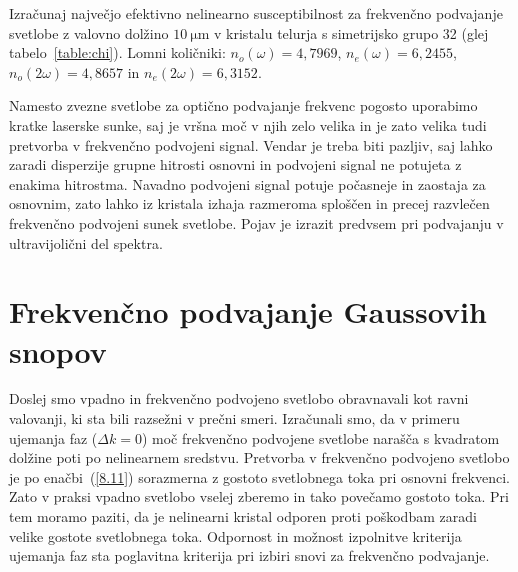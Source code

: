 \begin{naloga}
Izračunaj največjo efektivno nelinearno susceptibilnost za
frekvenčno podvajanje svetlobe z valovno
dolžino $10~\si{\micro\metre}$ v kristalu telurja s simetrijsko grupo 32 (glej tabelo~\ref{table:chi}). 
Lomni količniki: $n_o(\omega) = 4,7969$, 
$n_e(\omega) = 6,2455$, $n_o(2\omega) = 4,8657$ in $n_e(2\omega) = 6,3152$.
\end{naloga}

\begin{remark}
Namesto zvezne svetlobe za optično podvajanje frekvenc pogosto uporabimo kratke laserske sunke, saj je 
vršna moč v njih zelo velika in je zato velika tudi pretvorba v frekvenčno podvojeni signal.
Vendar je treba biti pazljiv, saj lahko zaradi disperzije grupne hitrosti osnovni in 
podvojeni signal ne potujeta z enakima hitrostma. Navadno podvojeni signal potuje 
počasneje in zaostaja za osnovnim, zato lahko iz kristala izhaja razmeroma sploščen in 
precej razvlečen frekvenčno podvojeni sunek svetlobe. 
Pojav je izrazit predvsem pri podvajanju v
ultravijolični del spektra.
\end{remark}

\section{Frekvenčno podvajanje Gaussovih snopov}
Doslej smo vpadno in frekvenčno podvojeno svetlobo obravnavali kot ravni valovanji,
ki sta bili razsežni v prečni smeri. Izračunali smo, da v primeru 
ujemanja faz ($\Delta k=0$)
moč frekvenčno podvojene svetlobe narašča s kvadratom dolžine poti po nelinearnem
sredstvu. Pretvorba v frekvenčno podvojeno svetlobo je po enačbi~(\ref{8.11}) sorazmerna
z gostoto svetlobnega toka pri osnovni frekvenci.
Zato v praksi vpadno svetlobo vselej zberemo in tako povečamo gostoto toka. 
Pri tem moramo paziti, da je nelinearni kristal odporen proti poškodbam
zaradi velike gostote svetlobnega toka. Odpornost in možnost izpolnitve kriterija ujemanja 
faz sta poglavitna kriterija pri izbiri snovi za frekvenčno podvajanje. 

